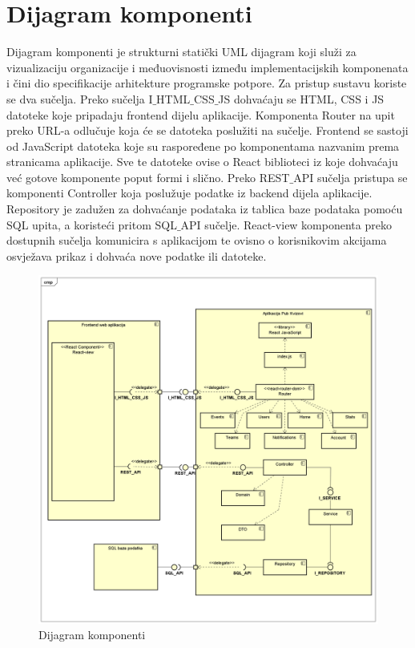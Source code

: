 		\eject
		\section{Dijagram komponenti}
		
			Dijagram komponenti je strukturni statički UML dijagram koji služi za vizualizaciju organizacije i međuovisnosti između implementacijskih komponenata i čini dio specifikacije arhitekture programske potpore. Za pristup sustavu koriste se dva sučelja. Preko sučelja I$\_$HTML$\_$CSS$\_$JS dohvaćaju se HTML, CSS i JS datoteke koje pripadaju frontend dijelu aplikacije. Komponenta Router na upit preko URL-a odlučuje koja će se datoteka poslužiti na sučelje. Frontend se sastoji od JavaScript datoteka koje su raspoređene po komponentama nazvanim prema stranicama aplikacije. Sve te datoteke ovise o React biblioteci iz koje dohvaćaju već gotove komponente poput formi i slično. Preko REST$\_$API sučelja pristupa se komponenti Controller koja poslužuje podatke iz backend dijela aplikacije. Repository je zadužen za dohvaćanje podataka iz tablica baze podataka pomoću SQL upita, a koristeći pritom SQL$\_$API sučelje. React-view komponenta preko dostupnih sučelja komunicira s aplikacijom te ovisno o korisnikovim akcijama osvježava prikaz i dohvaća nove podatke ili datoteke.
			
			\begin{figure}[H]
				\includegraphics[width=\textwidth]{dijagrami/ComponentDiagram.PNG} 
				\caption{Dijagram komponenti}
				\label{fig:ComponentDiagram}
			\end{figure}
		
	